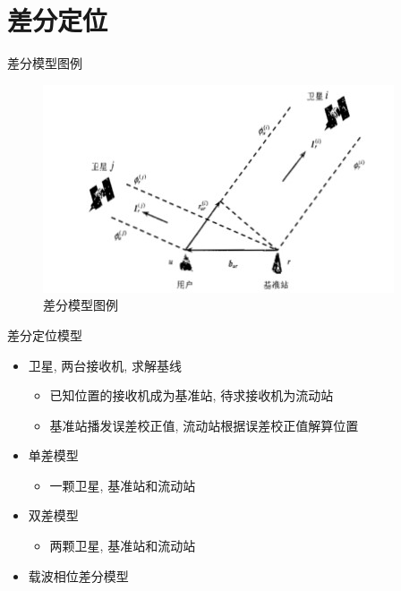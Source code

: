 \section{差分定位}
\begin{frame}{差分模型图例}
    \begin{figure}
        \centering
        \includegraphics[width = .7\textwidth]{pic/single_double_diff.jpg}
        \caption{差分模型图例}
        \label{fig:single_double_diff}
    \end{figure}
\end{frame}

\begin{frame}{差分定位模型}
    \begin{itemize}
        \item 卫星, 两台接收机, 求解基线
        \begin{itemize}
            \item 已知位置的接收机成为基准站, 待求接收机为流动站
            \item 基准站播发误差校正值, 流动站根据误差校正值解算位置
        \end{itemize}
        \item 单差模型
        \begin{itemize}
            \item 一颗卫星, 基准站和流动站
        \end{itemize}
        \item 双差模型
        \begin{itemize}
            \item 两颗卫星, 基准站和流动站
        \end{itemize}
        \item 载波相位差分模型
    \end{itemize}
\end{frame}

